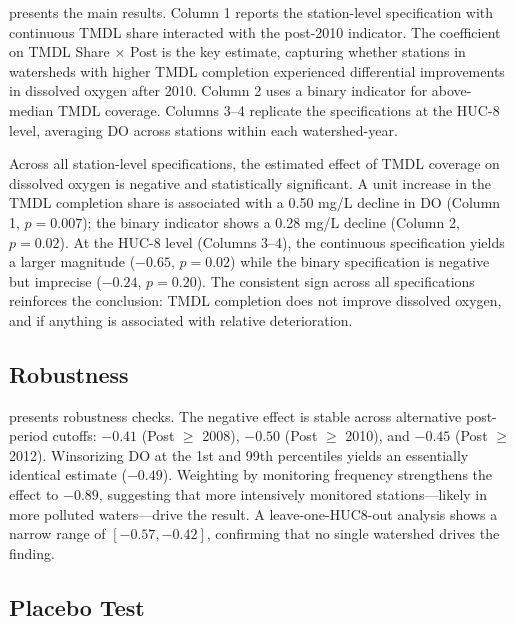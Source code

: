 \documentclass[12pt]{article}
\begin{document}


 presents the main results. Column 1 reports the station-level specification with continuous TMDL share interacted with the post-2010 indicator. The coefficient on TMDL Share $\times$ Post is the key estimate, capturing whether stations in watersheds with higher TMDL completion experienced differential improvements in dissolved oxygen after 2010. Column 2 uses a binary indicator for above-median TMDL coverage. Columns 3--4 replicate the specifications at the HUC-8 level, averaging DO across stations within each watershed-year.

Across all station-level specifications, the estimated effect of TMDL coverage on dissolved oxygen is negative and statistically significant. A unit increase in the TMDL completion share is associated with a 0.50 mg/L decline in DO (Column 1, $p = 0.007$); the binary indicator shows a 0.28 mg/L decline (Column 2, $p = 0.02$). At the HUC-8 level (Columns 3--4), the continuous specification yields a larger magnitude ($-0.65$, $p = 0.02$) while the binary specification is negative but imprecise ($-0.24$, $p = 0.20$). The consistent sign across all specifications reinforces the conclusion: TMDL completion does not improve dissolved oxygen, and if anything is associated with relative deterioration.

\subsection{Robustness}



 presents robustness checks. The negative effect is stable across alternative post-period cutoffs: $-0.41$ (Post $\geq$ 2008), $-0.50$ (Post $\geq$ 2010), and $-0.45$ (Post $\geq$ 2012). Winsorizing DO at the 1st and 99th percentiles yields an essentially identical estimate ($-0.49$). Weighting by monitoring frequency strengthens the effect to $-0.89$, suggesting that more intensively monitored stations---likely in more polluted waters---drive the result. A leave-one-HUC8-out analysis shows a narrow range of $[-0.57, -0.42]$, confirming that no single watershed drives the finding.

\subsection{Placebo Test}


\end{document}
